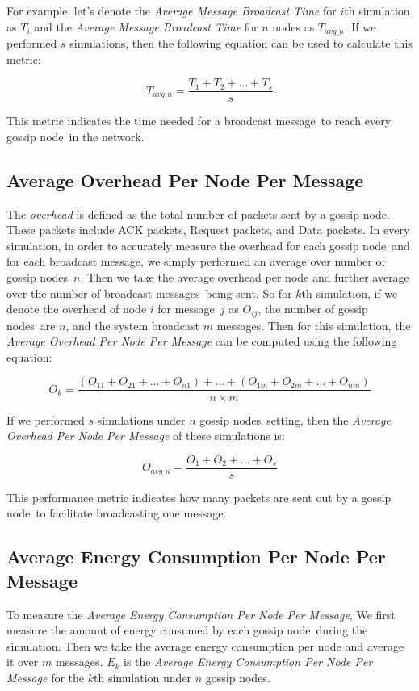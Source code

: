 \documentclass[onehalf,11pt]{beavtex}
\newcommand{\msgs}{messages}
\newcommand{\msg}{message}
\newcommand{\gn}{gossip node}
\newcommand{\gns}{gossip nodes}
\begin{document}
For example, let's denote the \emph{Average Message Broadcast Time} for $i$th simulation as $T_i$ and the \emph{Average Message Broadcast Time} for $n$ nodes as $T_{avg\_n}$. If we performed $s$ simulations, then the following equation can be used to calculate this metric:

\[ T_{avg\_n} = \frac{T_1 + T_2 + \ldots + T_s}{s} \]

This metric indicates the time needed for a broadcast \msg ~to reach every \gn ~in the network.

\subsection{Average Overhead Per Node Per Message}

The \emph{overhead} is defined as the total number of packets sent by a \gn. These packets include ACK packets, Request packets, and Data packets. In every simulation, in order to accurately measure the overhead for each \gn ~and for each broadcast \msg, we simply performed an average over number of \gns ~$n$. Then we take the average overhead per node and further average over the number of broadcast \msgs ~being sent. So for $k$th simulation, if we denote the overhead of node $i$ for \msg ~$j$ as $O_{ij}$, the number of \gns ~are $n$, and the system broadcast $m$ \msgs. Then for this simulation, the \emph{Average Overhead Per Node Per Message} can be computed using the following equation:

\[ O_{k} = \frac{(O_{11} + O_{21} + \ldots + O_{n1})  + \ldots + (O_{1m} + O_{2m} + \ldots + O_{nm})}{n\times m} \]

If we performed $s$ simulations under $n$ \gns ~setting, then the \emph{Average Overhead Per Node Per Message} of these simulations is:

\[ O_{avg\_n} = \frac{O_1 + O_2 + \ldots + O_s}{s} \]


This performance metric indicates how many packets are sent out by a \gn ~to facilitate broadcasting one \msg. 

\subsection{Average Energy Consumption Per Node Per Message}

To measure the \emph{Average Energy Consumption Per Node Per Message}, We first measure the amount of energy consumed by each \gn ~during the simulation. Then we take the average energy consumption per node and average it over $m$ \msgs. $E_k$ is the \emph{Average Energy Consumption Per Node Per Message} for the $k$th simulation under $n$ \gns.
\end{document}
